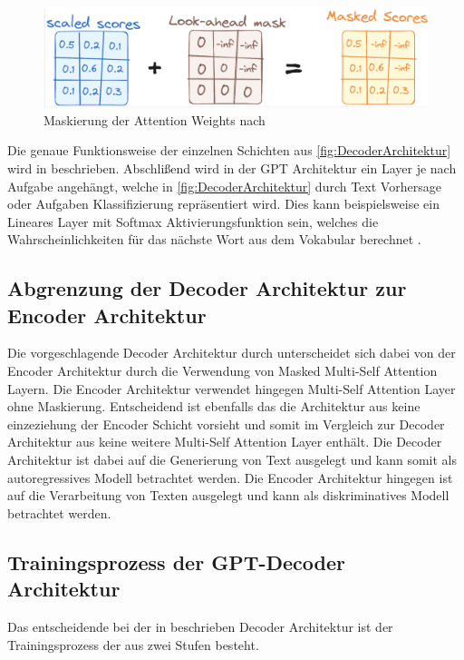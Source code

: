 \documentclass[conference]{IEEEtran}
\begin{document}
\begin{figure}[htbp]
    \centerline{\includegraphics[width=\linewidth]{Bilder/MaskierungAttentionWeights.png}}
    \caption{Maskierung der Attention Weights nach \cite{WieTransformatorenFunktionieren}}
\label{fig:Maskierung}
\end{figure}
Die genaue Funktionsweise der einzelnen Schichten aus \autoref{fig:DecoderArchitektur}  wird in \cite{vaswaniAttentionAllYou2023} beschrieben. Abschlißend wird in der GPT Architektur ein Layer je nach Aufgabe angehängt, welche in \autoref{fig:DecoderArchitektur} durch Text Vorhersage oder Aufgaben Klassifizierung repräsentiert wird. Dies kann beispielsweise ein Lineares Layer mit Softmax Aktivierungsfunktion sein, welches die Wahrscheinlichkeiten für das nächste Wort aus dem Vokabular berechnet \cite{WieTransformatorenFunktionieren}.
\subsection{Abgrenzung der Decoder Architektur zur Encoder Architektur}
Die vorgeschlagende Decoder Architektur durch \cite{radfordImprovingLanguageUnderstanding} unterscheidet sich dabei von der Encoder Architektur durch die Verwendung von Masked Multi-Self Attention Layern. Die Encoder Architektur verwendet hingegen Multi-Self Attention Layer ohne Maskierung. Entscheidend ist ebenfalls das die Architektur aus \cite{radfordImprovingLanguageUnderstanding} keine einzeziehung der Encoder Schicht vorsieht und somit im Vergleich zur Decoder Architektur aus \cite{vaswaniAttentionAllYou2023} keine weitere Multi-Self Attention Layer enthält. Die Decoder Architektur ist dabei auf die Generierung von Text ausgelegt und kann somit als autoregressives Modell betrachtet werden. Die Encoder Architektur hingegen ist auf die Verarbeitung von Texten ausgelegt und kann als diskriminatives Modell betrachtet werden.
\subsection{Trainingsprozess der GPT-Decoder Architektur}
Das entscheidende bei der in \cite{radfordImprovingLanguageUnderstanding} beschrieben Decoder Architektur ist der Trainingsprozess der aus zwei Stufen besteht.
\end{document}
